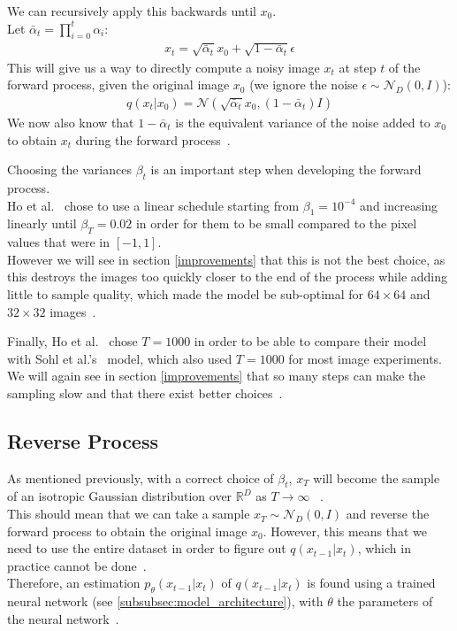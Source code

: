 \documentclass[twoside]{article}
\numberwithin{equation}{section}
\numberwithin{figure}{section}
\begin{document}
We can recursively apply this backwards until $x_0$. \\
Let $\bar{\alpha}_t = \prod_{i=0}^{t}{\alpha_i}$:
\begin{align}
  x_t = \sqrt{\bar{\alpha}_t} x_0 + \sqrt{1 - \bar{\alpha}_t} \epsilon
\end{align}
This will give us a way to directly compute a noisy image $x_t$ at step $t$ of the forward process, given the original image $x_0$ (we ignore the noise $\epsilon \sim \mathcal{N}_D\left(0, I\right)$):
\begin{align}
  q\left(x_t | x_0\right) = \mathcal{N}\left(\sqrt{\bar{\alpha}_t} x_0, \left(1 - \bar{\alpha}_t\right)I\right) \label{eq:quickforwardprocess}
\end{align}
We now also know that $1 - \bar{\alpha}_t$ is the equivalent variance of the noise added to $x_0$ to obtain $x_t$ during the forward process~\cite{nichol2021improved}.

Choosing the variances $\beta_t$ is an important step when developing the forward process. \\
Ho et al.~\cite{ho2020denoising} chose to use a linear schedule starting from $\beta_1 = 10^{-4}$ and increasing linearly until $\beta_T = 0.02$ in order for them to be small compared to the pixel values that were in $\left[-1, 1\right]$. \\
However we will see in section \ref{improvements} that this is not the best choice, as this destroys the images too quickly closer to the end of the process while adding little to sample quality, which made the model be sub-optimal for $64 \times 64$ and $32 \times 32$ images~\cite{nichol2021improved}.

Finally, Ho et al.~\cite{ho2020denoising} chose $T = 1000$ in order to be able to compare their model with Sohl et al.'s~\cite{sohldickstein2015deep} model, which also used $T = 1000$ for most image experiments. \\
We will again see in section \ref{improvements} that so many steps can make the sampling slow and that there exist better choices~\cite{nichol2021improved}.
\subsection{Reverse Process}
As mentioned previously, with a correct choice of $\beta_t$, $x_T$ will become the sample of an isotropic Gaussian distribution over $\mathbb{R}^D$ as $T \rightarrow \infty$~\cite{nichol2021improved, sohldickstein2015deep} . \\
This should mean that we can take a sample $x_T \sim \mathcal{N}_D \left(0, I\right)$ and reverse the forward process to obtain the original image $x_0$. 
However, this means that we need to use the entire dataset in order to figure out $q\left(x_{t-1} | x_t\right)$, which in practice cannot be done~\cite{nichol2021improved}. \\
Therefore, an estimation $p_\theta (x_{t-1} | x_t)$ of $q(x_{t-1}|x_t)$ is found using a trained neural network (see \ref{subsubsec:model_architecture}), with $\theta$ the parameters of the neural network~\cite{nichol2021improved}.
\end{document}
